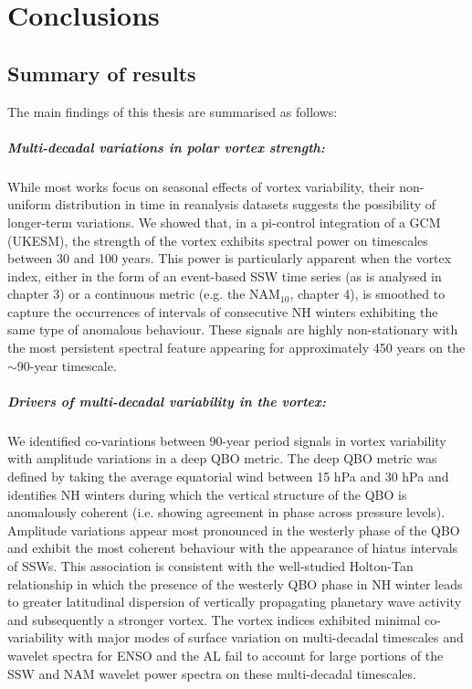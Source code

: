 \chapter{Conclusions}
\label{cha:conclusions}

\section{Summary of results}

The main findings of this thesis are summarised as follows: 

\paragraph{Multi-decadal variations in polar vortex strength:}
While most works focus on seasonal effects of vortex variability, their non-uniform distribution in time in reanalysis datasets suggests the possibility of longer-term variations. We showed that, in a pi-control integration of a GCM (UKESM), the strength of the vortex exhibits spectral power on timescales between 30 and 100 years. This power is particularly apparent when the vortex index, either in the form of an event-based SSW time series (as is analysed in chapter 3) or a continuous metric (e.g. the NAM$_{10}$, chapter 4), is smoothed to capture the occurrences of intervals of consecutive NH winters exhibiting the same type of anomalous behaviour. These signals are highly non-stationary with the most persistent spectral feature appearing for approximately 450 years on the $\sim$90-year timescale. 

\paragraph{Drivers of multi-decadal variability in the vortex:}
We identified co-variations between 90-year period signals in vortex variability with amplitude variations in a deep QBO metric. The deep QBO metric was defined by taking the average equatorial wind between 15 hPa and 30 hPa and identifies NH winters during which the vertical structure of the QBO is anomalously coherent (i.e. showing agreement in phase across pressure levels). Amplitude variations appear most pronounced in the westerly phase of the QBO and exhibit the most coherent behaviour with the appearance of hiatus intervals of SSWs. This association is consistent with the well-studied Holton-Tan relationship in which the presence of the westerly QBO phase in NH winter leads to greater latitudinal dispersion of vertically propagating planetary wave activity and subsequently a stronger vortex. The vortex indices exhibited minimal co-variability with major modes of surface variation on multi-decadal timescales and wavelet spectra for ENSO and the AL fail to account for large portions of the SSW and NAM wavelet power spectra on these multi-decadal timescales.

